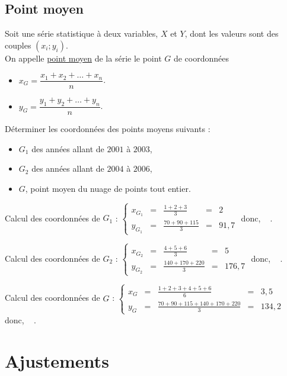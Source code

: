 \documentclass[french]{book}
\newcommand{\Syst}[2]{\left\{\begin{array}{lcccc} #1 \\ #2 \end{array}\right.}
\begin{document}
\subsection{Point moyen}

\begin{defn}
   Soit une série statistique à deux variables, $X$ et $Y$, dont les valeurs sont des couples $(x_i;y_i)$.\\
   On appelle \underline{point moyen} de la série le point $G$ de coordonnées
   \begin{itemize}
      \item[$\bullet$] $x_G=\dfrac{x_1+x_2+ \dots + x_n}{n}$.
      \item[$\bullet$] $y_G=\dfrac{y_1+y_2+ \dots + y_n}{n}$.
   \end{itemize}
\end{defn}

\begin{exemple}
   Déterminer les coordonnées des points moyens suivants :
   \begin{itemize}
      \item[$\bullet$] $G_1$ des années allant de $2001$ à $2003$,
      \item[$\bullet$] $G_2$ des années allant de $2004$ à $2006$,
      \item[$\bullet$] $G$, point moyen du nuage de points tout entier.
   \end{itemize}
\end{exemple}

Calcul des coordonnées de $G_1$ : $\Syst{x_{G_1} & = & \frac{1+2+3}{3} & = & 2}{y_{G_1} & = & \frac{70+90+115}{3} & = & 91,7}$ \qquad donc, ~ .

Calcul des coordonnées de $G_2$ : $\Syst{x_{G_2} & = & \frac{4+5+6}{3} & = & 5}{y_{G_2} & = & \frac{140+170+220}{3} & = & 176,7}$ \qquad donc, ~ .

Calcul des coordonnées de $G$ : $\Syst{x_G & = & \frac{1+2+3+4+5+6}{6} & = & 3,5}{y_G & = & \frac{70+90+115+140+170+220}{3} & = & 134,2}$ \qquad donc, ~ .


\section{Ajustements}
\end{document}
